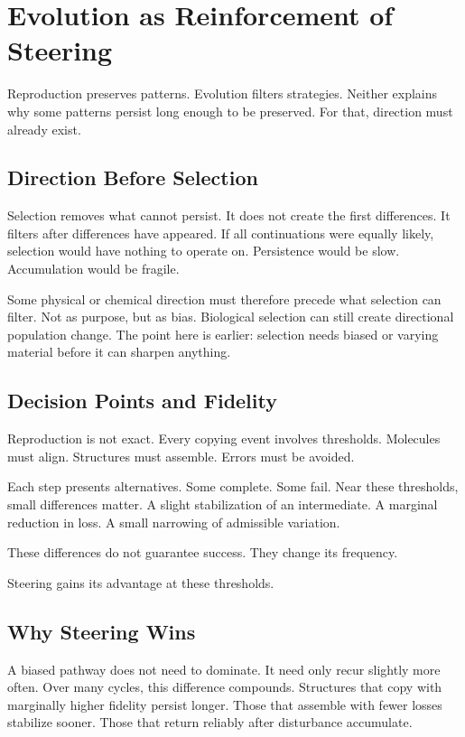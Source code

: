 \documentclass[11pt,twoside,openright]{book}
\begin{document}
\chapter{Evolution as Reinforcement of Steering}

Reproduction preserves patterns. Evolution filters strategies. Neither explains why some patterns persist long enough to be preserved. For that, direction must already exist.

\section*{Direction Before Selection}

Selection removes what cannot persist. It does not create the first differences. It filters after differences have appeared. If all continuations were equally likely, selection would have nothing to operate on. Persistence would be slow. Accumulation would be fragile.

Some physical or chemical direction must therefore precede what selection can filter. Not as purpose, but as bias. Biological selection can still create directional population change. The point here is earlier: selection needs biased or varying material before it can sharpen anything.

\section*{Decision Points and Fidelity}

Reproduction is not exact. Every copying event involves thresholds. Molecules must align. Structures must assemble. Errors must be avoided.

Each step presents alternatives. Some complete. Some fail. Near these thresholds, small differences matter. A slight stabilization of an intermediate. A marginal reduction in loss. A small narrowing of admissible variation.

These differences do not guarantee success. They change its frequency.

Steering gains its advantage at these thresholds.

\section*{Why Steering Wins}

A biased pathway does not need to dominate. It need only recur slightly more often. Over many cycles, this difference compounds. Structures that copy with marginally higher fidelity persist longer. Those that assemble with fewer losses stabilize sooner. Those that return reliably after disturbance accumulate.
\end{document}
